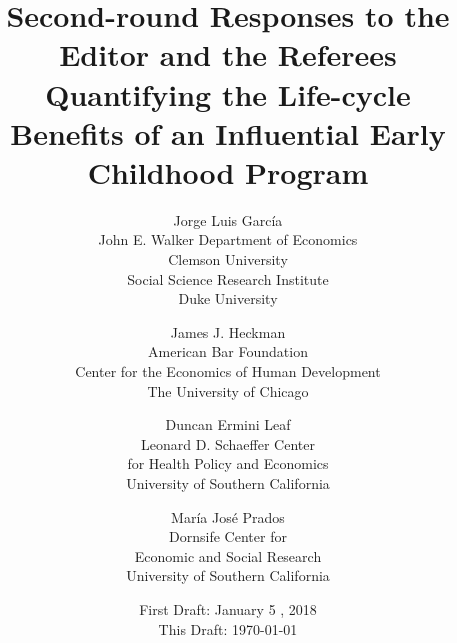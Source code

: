 

\usepackage[stable]{footmisc}

\newcommand*\leftright[2]{%
  \leavevmode
  \rlap{#1}%
  \hspace{0.5\linewidth}%
  #2}

\newcommand{\orth}{\ensuremath{\perp\!\!\!\perp}}%
\newcommand{\indep}{\orth}%
\newcommand{\notorth}{\ensuremath{\perp\!\!\!\!\!\!\diagup\!\!\!\!\!\!\perp}}%
\newcommand{\notindep}{\notorth}

\renewcommand{\theequation}{R.\arabic{equation}}



\doublespacing



\singlespacing
\begin{titlepage}

\title{\Large \textbf{Second-round Responses to the Editor and the Referees \\ Quantifying the Life-cycle \\ Benefits of an Influential Early Childhood Program}}

\author{
Jorge Luis Garc\'{i}a\\
John E. Walker  Department of Economics\\
Clemson University \\
Social Science Research Institute \\
Duke University \\  \and
James J. Heckman \\
American Bar Foundation \\
Center for the Economics of Human Development \\
The University of Chicago \and
Duncan Ermini Leaf \\
Leonard D. Schaeffer Center \\  for Health Policy and Economics\\
University of Southern California \and
Mar\'{i}a Jos\'{e} Prados \\
Dornsife Center for \\ Economic and Social Research\\
University of Southern California}
\date{First Draft: January 5 , 2018\\ This Draft: \today}

\maketitle
\thispagestyle{empty}
\end{titlepage}

